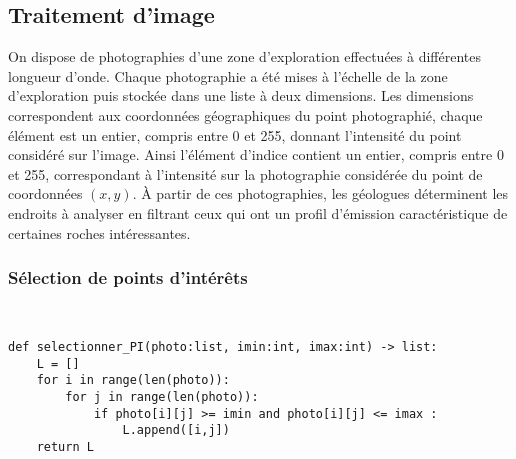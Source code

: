 \subsection{Traitement d’image}
\ifprof
\else
On dispose de photographies d’une zone d’exploration effectuées à différentes longueur d’onde. Chaque photographie
a été mises à l’échelle de la zone d’exploration puis stockée dans une liste
à deux dimensions. Les dimensions correspondent aux coordonnées géographiques du point photographié, chaque
élément est un entier, compris entre 0 et 255, donnant l’intensité du point considéré sur l’image. Ainsi l’élément
d’indice  contient un entier, compris entre 0 et 255, correspondant à l’intensité sur la photographie considérée
du point de coordonnées $(x,y)$. À partir de ces photographies, les géologues déterminent les endroits à analyser
en filtrant ceux qui ont un profil d’émission caractéristique de certaines roches intéressantes.
\fi

\subsubsection{Sélection de points d’intérêts}

\ifprof
\begin{corrige}~\\ \vspace{-.7cm}
\begin{lstlisting}
def selectionner_PI(photo:list, imin:int, imax:int) -> list:
    L = []
    for i in range(len(photo)):
        for j in range(len(photo)):
            if photo[i][j] >= imin and photo[i][j] <= imax :
                L.append([i,j])
    return L
\end{lstlisting}
\end{corrige}\else
\fi


